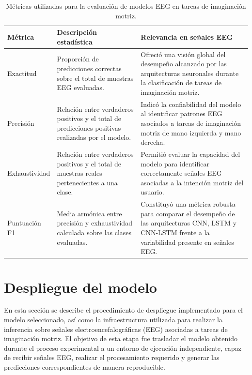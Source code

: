 \begin{table}[htbp]
\centering
\caption{Métricas utilizadas para la evaluación de modelos EEG en tareas de imaginación motriz.}
\label{tab:metricas_evaluacion}

\begin{tabular}{p{2.3cm}p{4.3cm}p{6cm}}
\toprule
\textbf{Métrica} & \textbf{Descripción estadística} & \textbf{Relevancia en señales EEG} \\
\midrule
Exactitud &
Proporción de predicciones correctas sobre el total de muestras EEG evaluadas. &
Ofreció una visión global del desempeño alcanzado por las arquitecturas neuronales durante la clasificación de tareas de imaginación motriz. \\ 

Precisión &
Relación entre verdaderos positivos y el total de predicciones positivas realizadas por el modelo. &
Indicó la confiabilidad del modelo al identificar patrones EEG asociados a tareas de imaginación motriz de mano izquierda y mano derecha. \\ 

Exhaustividad &
Relación entre verdaderos positivos y el total de muestras reales pertenecientes a una clase. &
Permitió evaluar la capacidad del modelo para identificar correctamente señales EEG asociadas a la intención motriz del usuario. \\ 

Puntuación F1 &
Media armónica entre precisión y exhaustividad calculada sobre las clases evaluadas. &
Constituyó una métrica robusta para comparar el desempeño de las arquitecturas CNN, LSTM y CNN-LSTM frente a la variabilidad presente en señales EEG. \\ 

\end{tabular}
\end{table}



\FloatBarrier

\section{Despliegue del modelo}

En esta sección se describe el procedimiento de despliegue implementado para el modelo seleccionado, así como la infraestructura utilizada para realizar la inferencia sobre señales electroencefalográficas (EEG) asociadas a tareas de imaginación motriz. El objetivo de esta etapa fue trasladar el modelo obtenido durante el proceso experimental a un entorno de ejecución independiente, capaz de recibir señales EEG, realizar el procesamiento requerido y generar las predicciones correspondientes de manera reproducible.

